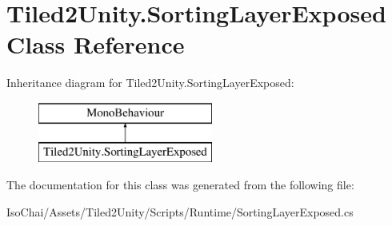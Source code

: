 \hypertarget{class_tiled2_unity_1_1_sorting_layer_exposed}{}\section{Tiled2\+Unity.\+Sorting\+Layer\+Exposed Class Reference}
\label{class_tiled2_unity_1_1_sorting_layer_exposed}
Inheritance diagram for Tiled2\+Unity.\+Sorting\+Layer\+Exposed\+:\begin{figure}[H]
\begin{center}
\leavevmode
\includegraphics[height=2.000000cm]{class_tiled2_unity_1_1_sorting_layer_exposed}
\end{center}
\end{figure}


The documentation for this class was generated from the following file\+:\begin{DoxyCompactItemize}
\item 
Iso\+Chai/\+Assets/\+Tiled2\+Unity/\+Scripts/\+Runtime/Sorting\+Layer\+Exposed.\+cs\end{DoxyCompactItemize}
